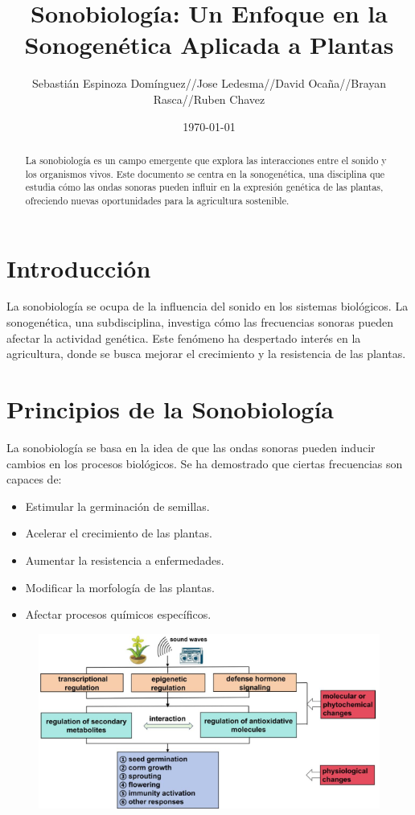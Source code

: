 \documentclass[twocolumn]{article}
\title{Sonobiología: Un Enfoque en la Sonogenética Aplicada a Plantas}
\author{Sebastián Espinoza Domínguez//Jose Ledesma//David Ocaña//Brayan Rasca//Ruben Chavez}
\date{\today}
\begin{document}
\maketitle

\begin{abstract}
La sonobiología es un campo emergente que explora las interacciones entre el sonido y los organismos vivos. Este documento se centra en la sonogenética, una disciplina que estudia cómo las ondas sonoras pueden influir en la expresión genética de las plantas, ofreciendo nuevas oportunidades para la agricultura sostenible.
\end{abstract}

\section{Introducción}
La sonobiología se ocupa de la influencia del sonido en los sistemas biológicos. La sonogenética, una subdisciplina, investiga cómo las frecuencias sonoras pueden afectar la actividad genética. Este fenómeno ha despertado interés en la agricultura, donde se busca mejorar el crecimiento y la resistencia de las plantas.

\section{Principios de la Sonobiología}
La sonobiología se basa en la idea de que las ondas sonoras pueden inducir cambios en los procesos biológicos. Se ha demostrado que ciertas frecuencias son capaces de:

\begin{itemize}
    \item Estimular la germinación de semillas.
    \item Acelerar el crecimiento de las plantas.
    \item Aumentar la resistencia a enfermedades.
    \item Modificar la morfología de las plantas.
    \item Afectar procesos químicos específicos.
\end{itemize}

\begin{figure}[!h]
    \centering
    \includegraphics[width=\linewidth]{imagenes/Captura desde 2024-09-25 22-41-01.png}       
\end{figure}
\end{document}
